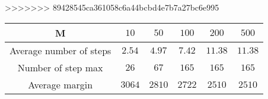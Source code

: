 >>>>>>> 89428545ca361058c6a44bcbd4e7b7a27bc6e995

\begin{center}
\begin{tabular}{ |c|c|c|c|c|c| }
\hline
    M & $10$&$50$& $100$& $200$& $500$\\
    \hline
    Average number of steps & $2.54$ & $4.97$& $7.42$& $11.38$ & $11.38$\\
    \hline
    Number of step max & $26$ & $67$& $165$& $165$ & $165$\\
    \hline
     Average margin & $3064$ & $2810$& $2722$& $2510$ & $2510$\\
    \hline
 \end{tabular}
\end{center}

